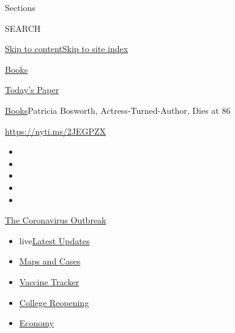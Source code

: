 Sections

SEARCH

\protect\hyperlink{site-content}{Skip to
content}\protect\hyperlink{site-index}{Skip to site index}

\href{https://www.nytimes.com/section/books}{Books}

\href{https://myaccount.nytimes.com/auth/login?response_type=cookie\&client_id=vi}{}

\href{https://www.nytimes.com/section/todayspaper}{Today's Paper}

\href{/section/books}{Books}\textbar{}Patricia Bosworth,
Actress-Turned-Author, Dies at 86

\url{https://nyti.ms/2JEGPZX}

\begin{itemize}
\item
\item
\item
\item
\item
\end{itemize}

\href{https://www.nytimes.com/news-event/coronavirus?action=click\&pgtype=Article\&state=default\&region=TOP_BANNER\&context=storylines_menu}{The
Coronavirus Outbreak}

\begin{itemize}
\tightlist
\item
  live\href{https://www.nytimes.com/2020/08/03/world/coronavirus-covid-19.html?action=click\&pgtype=Article\&state=default\&region=TOP_BANNER\&context=storylines_menu}{Latest
  Updates}
\item
  \href{https://www.nytimes.com/interactive/2020/us/coronavirus-us-cases.html?action=click\&pgtype=Article\&state=default\&region=TOP_BANNER\&context=storylines_menu}{Maps
  and Cases}
\item
  \href{https://www.nytimes.com/interactive/2020/science/coronavirus-vaccine-tracker.html?action=click\&pgtype=Article\&state=default\&region=TOP_BANNER\&context=storylines_menu}{Vaccine
  Tracker}
\item
  \href{https://www.nytimes.com/2020/08/02/us/covid-college-reopening.html?action=click\&pgtype=Article\&state=default\&region=TOP_BANNER\&context=storylines_menu}{College
  Reopening}
\item
  \href{https://www.nytimes.com/live/2020/08/03/business/stock-market-today-coronavirus?action=click\&pgtype=Article\&state=default\&region=TOP_BANNER\&context=storylines_menu}{Economy}
\end{itemize}

